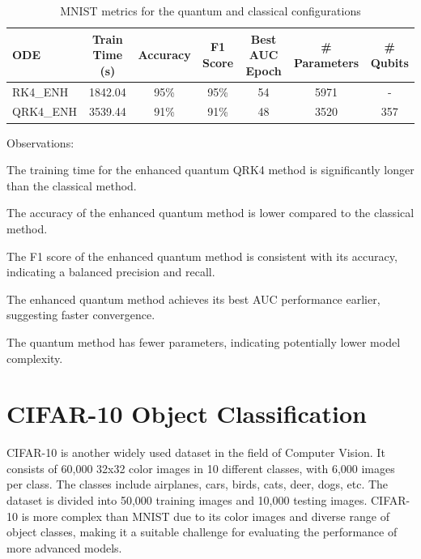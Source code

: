 \documentclass[12pt,a4paper]{report}
\begin{document}
\clearpage

\begin{table}[th]\small\linespread{1}
  \label{tab:hybrid_MNIST}
  \centering
  \begin{tabular}{|l|c|c|c|c|c|c|}
    \hline
    \textbf{ODE} & \textbf{Train Time (s)} & \textbf{Accuracy} & \textbf{F1 Score} & \textbf{Best AUC Epoch} & \textbf{\# Parameters} & \textbf{\# Qubits} \\
    \hline
    RK4\_ENH     & 1842.04                 & 95\%              & 95\%              & 54                      & 5971                   & -                  \\
    QRK4\_ENH    & 3539.44                 & 91\%              & 91\%              & 48                      & 3520                   & 357                \\
    \hline
  \end{tabular}
  \caption{MNIST metrics for the quantum and classical configurations}
\end{table}

Observations:

The training time for the enhanced quantum QRK4 method is significantly longer than the classical method.

The accuracy of the enhanced quantum method is lower compared to the classical method.

The F1 score of the enhanced quantum method is consistent with its accuracy, indicating a balanced precision and recall.

The enhanced quantum method achieves its best AUC performance earlier, suggesting faster convergence.

The quantum method has fewer parameters, indicating potentially lower model complexity.

\clearpage

\section{CIFAR-10 Object Classification}

CIFAR-10 is another widely used dataset in the field of Computer Vision. It consists of 60,000 32x32 color images in 10 different classes, with 6,000 images per class. The classes include airplanes, cars, birds, cats, deer, dogs, etc. The dataset is divided into 50,000 training images and 10,000 testing images. CIFAR-10 is more complex than MNIST due to its color images and diverse range of object classes, making it a suitable challenge for evaluating the performance of more advanced models.
\end{document}
